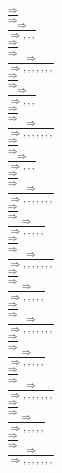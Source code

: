 \documentclass[11pt]{article}
\begin{document}
\begin{center}
\bigskip
\\$\frac{\Rightarrow }{\Rightarrow }$
\bigskip
\\$\frac{\Rightarrow }{\Rightarrow , , , }$
\bigskip
\\$\frac{\Rightarrow }{\Rightarrow }$
\bigskip
\\$\frac{\Rightarrow }{\Rightarrow , , , , , , , }$
\bigskip
\\$\frac{\Rightarrow }{\Rightarrow }$
\bigskip
\\$\frac{\Rightarrow }{\Rightarrow , , , }$
\bigskip
\\$\frac{\Rightarrow }{\Rightarrow }$
\bigskip
\\$\frac{\Rightarrow }{\Rightarrow , , , , , , , }$
\bigskip
\\$\frac{\Rightarrow }{\Rightarrow }$
\bigskip
\\$\frac{\Rightarrow }{\Rightarrow , , , }$
\bigskip
\\$\frac{\Rightarrow }{\Rightarrow }$
\bigskip
\\$\frac{\Rightarrow }{\Rightarrow , , , , , , , }$
\bigskip
\\$\frac{\Rightarrow }{\Rightarrow }$
\bigskip
\\$\frac{\Rightarrow }{\Rightarrow , , , , , }$
\bigskip
\\$\frac{\Rightarrow }{\Rightarrow }$
\bigskip
\\$\frac{\Rightarrow }{\Rightarrow , , , , , , , }$
\bigskip
\\$\frac{\Rightarrow }{\Rightarrow }$
\bigskip
\\$\frac{\Rightarrow }{\Rightarrow , , , , , }$
\bigskip
\\$\frac{\Rightarrow }{\Rightarrow }$
\bigskip
\\$\frac{\Rightarrow }{\Rightarrow , , , , , , , }$
\bigskip
\\$\frac{\Rightarrow }{\Rightarrow }$
\bigskip
\\$\frac{\Rightarrow }{\Rightarrow , , , , , }$
\bigskip
\\$\frac{\Rightarrow }{\Rightarrow }$
\bigskip
\\$\frac{\Rightarrow }{\Rightarrow , , , , , , , }$
\bigskip
\\$\frac{\Rightarrow }{\Rightarrow }$
\bigskip
\\$\frac{\Rightarrow }{\Rightarrow , , , , , }$
\bigskip
\\$\frac{\Rightarrow }{\Rightarrow }$
\bigskip
\\$\frac{\Rightarrow }{\Rightarrow , , , , , , , }$
\bigskip

\end{center}
\end{document}
